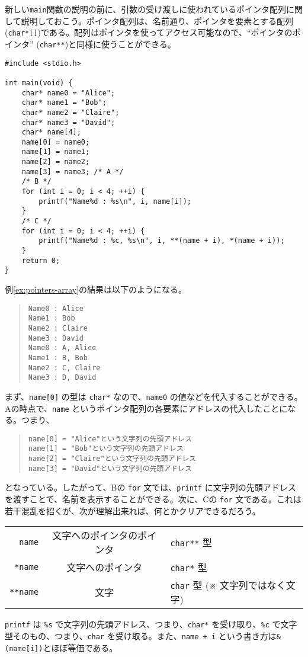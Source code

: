 新しい\texttt{main}関数の説明の前に、引数の受け渡しに使われているポインタ配列に関して説明しておこう。ポインタ配列は、名前通り、ポインタを要素とする配列(\texttt{char*[]})である。配列はポインタを使ってアクセス可能なので、``ポインタのポインタ'' (\texttt{char**})と同様に使うことができる。
\begin{reidai}\label{ex:pointers-array}
    \begin{verbatim}
#include <stdio.h>

int main(void) {
    char* name0 = "Alice";
    char* name1 = "Bob";
    char* name2 = "Claire";
    char* name3 = "David";
    char* name[4];
    name[0] = name0;
    name[1] = name1;
    name[2] = name2;
    name[3] = name3; /* A */
    /* B */
    for (int i = 0; i < 4; ++i) {
        printf("Name%d : %s\n", i, name[i]);
    }
    /* C */
    for (int i = 0; i < 4; ++i) {
        printf("Name%d : %c, %s\n", i, **(name + i), *(name + i));
    }
    return 0;
}
\end{verbatim}
\end{reidai} \noindent
例\ref{ex:pointers-array}の結果は以下のようになる。
\begin{quote}
    \begin{verbatim}
Name0 : Alice
Name1 : Bob
Name2 : Claire
Name3 : David
Name0 : A, Alice
Name1 : B, Bob
Name2 : C, Claire
Name3 : D, David
\end{verbatim}
\end{quote}
まず、\texttt{name[0]} の型は \texttt{char*} なので、\texttt{name0} の値などを代入することができる。Aの時点で、\texttt{name} というポインタ配列の各要素にアドレスの代入したことになる。つまり、
\begin{quote}
    \begin{verbatim}
name[0] = "Alice"という文字列の先頭アドレス
name[1] = "Bob"という文字列の先頭アドレス
name[2] = "Claire"という文字列の先頭アドレス
name[3] = "David"という文字列の先頭アドレス
\end{verbatim}
\end{quote}
となっている。したがって、Bの \texttt{for} 文では、\texttt{printf} に文字列の先頭アドレスを渡すことで、名前を表示することができる。次に、Cの \texttt{for} 文である。これは若干混乱を招くが、次が理解出来れば、何とかクリアできるだろう。
\begin{table}[H]
    \centering
    \begin{tabular}{r@{ = }c@{ = }l}
        \texttt{name}   & 文字へのポインタのポインタ & \texttt{char**} 型                      \\
        \texttt{*name}  & 文字へのポインタ           & \texttt{char*} 型                       \\
        \texttt{**name} & 文字                       & \texttt{char} 型 (※ 文字列ではなく文字)
    \end{tabular}
\end{table}
\texttt{printf} は \texttt{\%s} で文字列の先頭アドレス、つまり、\texttt{char*} を受け取り、\texttt{\%c} で文字型そのもの、つまり、\texttt{char} を受け取る。また、\texttt{name + i} という書き方は\texttt{\&(name[i])}とほぼ等価である。

